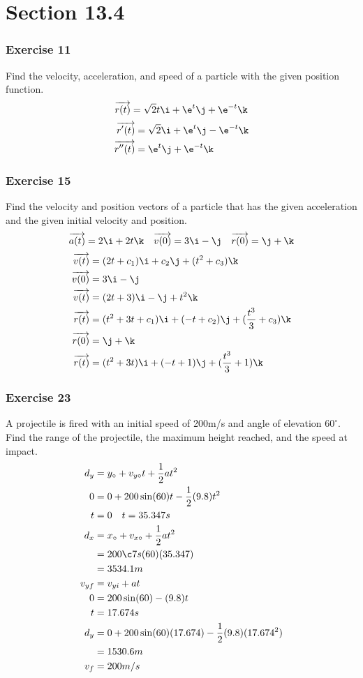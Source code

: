 \documentclass[letterpaper, 12pt]{math}
\begin{document}
\section*{Section 13.4}

\subsubsection*{Exercise 11}
Find the velocity, acceleration, and speed of a particle with the given position
function.
\[ \overrightarrow{r(t)} = \sqrt{2}t\i+\e^t\j+\e^{-t}\k \]
\begin{align*}
  \overrightarrow{r'(t)} &= \sqrt{2}\i+\e^t\j-\e^{-t}\k \\
  \overrightarrow{r''(t)} &= \e^t\j+\e^{-t}\k
\end{align*}

\subsubsection*{Exercise 15}
Find the velocity and position vectors of a particle that has the given
acceleration and the given initial velocity and position.
\[ \overrightarrow{a(t)} = 2\i+2t\k \quad \overrightarrow{v(0)} = 3\i-\j \quad
  \overrightarrow{r(0)} = \j+\k \]
\begin{align*}
  \overrightarrow{v(t)} &= (2t+c_1)\i+c_2\j+(t^2+c_3)\k \\
  \overrightarrow{v(0)} &= 3\i-\j \\
  \overrightarrow{v(t)} &= (2t+3)\i-\j+t^2\k \\
  \overrightarrow{r(t)} &= (t^2+3t+c_1)\i+(-t+c_2)\j+(\frac{t^3}{3}+c_3)\k \\
  \overrightarrow{r(0)} &= \j+\k \\
  \overrightarrow{r(t)} &= (t^2+3t)\i+(-t+1)\j+(\frac{t^3}{3}+1)\k
\end{align*}

\subsubsection*{Exercise 23}
A projectile is fired with an initial speed of 200m/s and angle of elevation
\( 60^{\circ} \). Find the range of the projectile, the maximum height reached,
and the speed at impact.
\begin{align*}
  d_y &= y_{\circ}+v_{y\circ}t+\frac{1}{2}at^2 \\
  0 &= 0+200\sin(60)t-\frac{1}{2}(9.8)t^2 \\
  t &= 0 \quad t = 35.347s \\
  d_x &= x_{\circ}+v_{x\circ}+\frac{1}{2}at^2 \\
  &= 200\c7s(60)(35.347) \\
  &= 3534.1m \\
  v_{yf} &= v_{yi}+at \\
  0 &= 200\sin(60)-(9.8)t \\
  t &= 17.674s \\
  d_y &= 0+200\sin(60)(17.674)-\frac{1}{2}(9.8)(17.674^2) \\
  &= 1530.6m \\
  v_f &= 200m/s
\end{align*}
\end{document}
